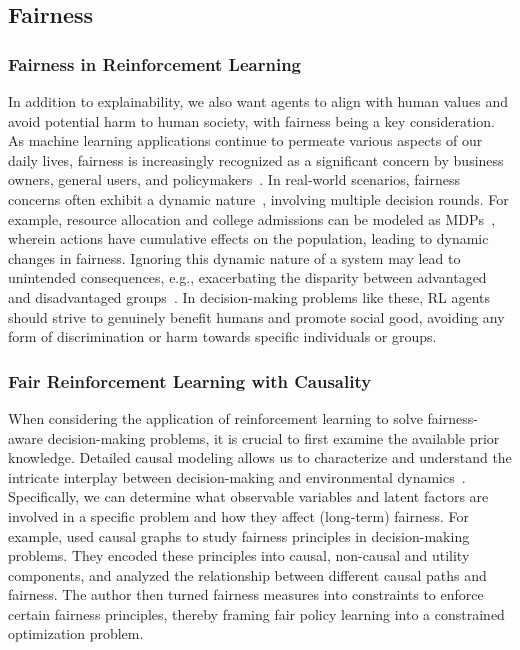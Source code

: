 \documentclass[10pt]{article} %
\theoremstyle{definition}
\begin{document}
\subsection{Fairness}
\subsubsection{Fairness in Reinforcement Learning}
In addition to explainability, we also want agents to align with human values and avoid potential harm to human society, with fairness being a key consideration.
As machine learning applications continue to permeate various aspects of our daily lives, fairness is increasingly recognized as a significant concern by business owners, general users, and policymakers~\citep{careyCausalFairnessField2022}. In real-world scenarios, fairness concerns often exhibit a dynamic nature~\citep{gajaneSurveyFairReinforcement2022}, involving multiple decision rounds. For example, resource allocation and college admissions can be modeled as MDPs~\citep{damourFairnessNotStatic2020}, wherein actions have cumulative effects on the population, leading to dynamic changes in fairness. Ignoring this dynamic nature of a system may lead to unintended consequences, e.g., exacerbating the disparity between advantaged and disadvantaged groups~\citep{liuDelayedImpactFair2018, creagerCausalModelingFairness2020, damourFairnessNotStatic2020}. In decision-making problems like these, RL agents should strive to genuinely benefit humans and promote social good, avoiding any form of discrimination or harm towards specific individuals or groups.

\subsubsection{Fair Reinforcement Learning with Causality} 
When considering the application of reinforcement learning to solve fairness-aware decision-making problems, it is crucial to first examine the available prior knowledge. 
Detailed causal modeling allows us to characterize and understand the intricate interplay between decision-making and environmental dynamics~\citep{zhangHowFairDecisions2020,tangTierBalancingDynamic2023}. 
Specifically, we can determine what observable variables and latent factors are involved in a specific problem and how they affect (long-term) fairness. 
For example, \citet{balakrishnanSCALESFairnessPrinciples2022a} used causal graphs to study fairness principles in decision-making problems. They encoded these principles into causal, non-causal and utility components, and analyzed the relationship between different causal paths and fairness. The author then turned fairness measures into constraints to enforce certain fairness principles, thereby framing fair policy learning into a constrained optimization problem. 
\end{document}
